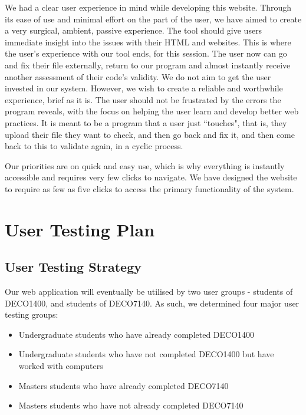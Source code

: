 \documentclass[10pt]{article}
\begin{document}
We had a clear user experience in mind while developing this website. Through its ease of use and minimal effort on the part of the user, we have aimed to create a very surgical, ambient, passive experience. The tool should give users immediate insight into the issues with their HTML and websites. This is where the user's experience with our tool ends, for this session. The user now can go and fix their file externally, return to our program and almost instantly receive another assessment of their code's validity. We do not aim to get the user invested in our system. However, we wish to create a reliable and worthwhile experience, brief as it is. The user should not be frustrated by the errors the program reveals, with the focus on helping the user learn and develop better web practices. It is meant to be a program that a user just ``touches", that is, they upload their file they want to check, and then go back and fix it, and then come back to this to validate again, in a cyclic process.

Our priorities are on quick and easy use, which is why everything is instantly accessible and requires very few clicks to navigate. We have designed the website to require as few as five clicks to access the primary functionality of the system. %

\newpage

\section*{User Testing Plan}

\subsection*{User Testing Strategy}

Our web application will eventually be utilised by two user groups - students of DECO1400, and students of DECO7140. As such, we determined four major user testing groups:

\begin{itemize}
\item Undergraduate students who have already completed DECO1400
\item Undergraduate students who have not completed DECO1400 but have worked with computers
\item Masters students who have already completed DECO7140
\item Masters students who have not already completed DECO7140
\end{itemize}
\end{document}
